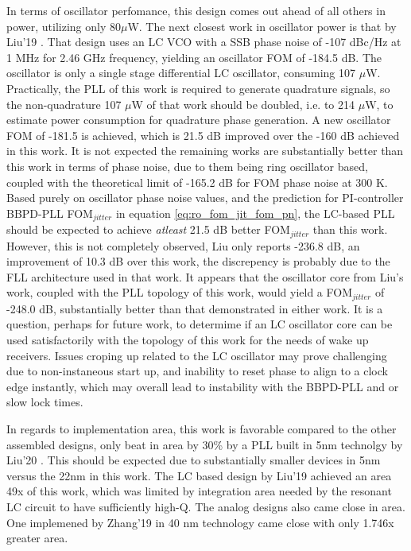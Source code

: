 In terms of oscillator perfomance, this design comes out ahead of all others in power, utilizing only 80$\mu$W. The next closest work in oscillator power is that by Liu'19 \cite{Liu2019}. That design uses an LC VCO with a SSB phase noise of -107 dBc/Hz at 1 MHz for 2.46 GHz frequency, yielding an oscillator FOM of -184.5 dB. The oscillator is only a single stage differential LC oscillator, consuming 107 $\mu$W. Practically, the PLL of this work is required to generate quadrature signals, so the non-quadrature 107 $\mu$W of that work should be doubled, i.e. to 214 $\mu$W, to estimate power consumption for quadrature phase generation. A new oscillator FOM of -181.5 is achieved, which is 21.5 dB improved over the -160 dB achieved in this work. It is not expected the remaining works are substantially better than this work in terms of phase noise, due to them being ring oscillator based, coupled with the theoretical limit of -165.2 dB for FOM phase noise at 300 K. Based purely on oscillator phase noise values, and the prediction for PI-controller BBPD-PLL FOM$_{jitter}$ in equation \ref{eq:ro_fom_jit_fom_pn}, the LC-based PLL should be expected to achieve \textit{atleast} 21.5 dB better FOM$_{jitter}$ than this work. However, this is not completely observed, Liu only reports -236.8 dB, an improvement of 10.3 dB over this work, the discrepency is probably due to the FLL architecture used in that work. It appears that the oscillator core from Liu's work, coupled with the PLL topology of this work, would yield a FOM$_{jitter}$ of -248.0 dB, substantially better than that demonstrated in either work. It is a question, perhaps for future work, to determime if an LC oscillator core can be used satisfactorily with the topology of this work for the needs of wake up receivers. Issues croping up related to the LC oscillator may prove challenging due to non-instaneous start up, and inability to reset phase to align to a clock edge instantly, which may overall lead to instability with the BBPD-PLL and or slow lock times. 

In regards to implementation area, this work is favorable compared to the other assembled designs, only beat in area by 30\% by a PLL built in 5nm technolgy by Liu'20 \cite{Liu2020}. This should be expected due to substantially smaller devices in 5nm versus the 22nm in this work. The LC based design by Liu'19 achieved an area 49x of this work, which was limited by integration area needed by the resonant LC circuit to have sufficiently high-Q. The analog designs also came close in area. One implemened by Zhang'19 \cite{Zhang2019} in 40 nm technology came close with only 1.746x greater area.

